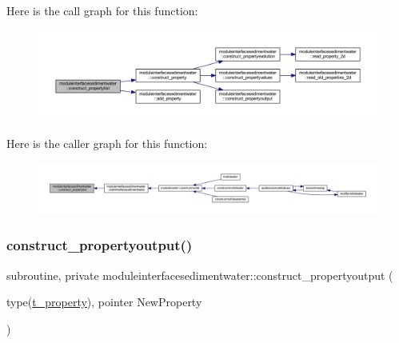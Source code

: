 Here is the call graph for this function\+:\nopagebreak
\begin{figure}[H]
\begin{center}
\leavevmode
\includegraphics[width=350pt]{namespacemoduleinterfacesedimentwater_a1db436f609ed9890367a1345dba195c0_cgraph}
\end{center}
\end{figure}
Here is the caller graph for this function\+:\nopagebreak
\begin{figure}[H]
\begin{center}
\leavevmode
\includegraphics[width=350pt]{namespacemoduleinterfacesedimentwater_a1db436f609ed9890367a1345dba195c0_icgraph}
\end{center}
\end{figure}
\mbox{\label{namespacemoduleinterfacesedimentwater_a63417d4ba89dc1cc869efface42ddc8a}} 
\subsubsection{\texorpdfstring{construct\+\_\+propertyoutput()}{construct\_propertyoutput()}}
{\footnotesize\ttfamily subroutine, private moduleinterfacesedimentwater\+::construct\+\_\+propertyoutput (\begin{DoxyParamCaption}\item[{type(\mbox{\hyperlink{structmoduleinterfacesedimentwater_1_1t__property}{t\+\_\+property}}), pointer}]{New\+Property }\end{DoxyParamCaption})\hspace{0.3cm}{\ttfamily [private]}}

